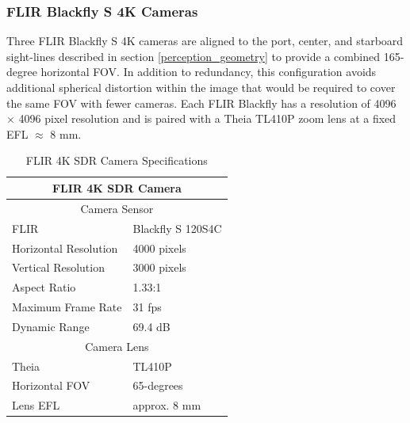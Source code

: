 \documentclass{erauthesis}
\begin{document}
\subsubsection{FLIR Blackfly S 4K Cameras} \label{sensors_FLIR}

Three FLIR Blackfly S 4K cameras are aligned to the port, center, and starboard sight-lines described in section \ref{perception_geometry} to provide a combined 165-degree horizontal \ac{FOV}.
In addition to redundancy, this configuration avoids additional spherical distortion within the image that would be required to cover the same \ac{FOV} with fewer cameras.
Each FLIR Blackfly has a resolution of 4096 $\times$ 4096 pixel resolution and is paired with a Theia TL410P zoom lens at a fixed \ac{EFL} $\approx$ 8 mm.


\begin{table}[htbp]
\centering
\caption{FLIR 4K SDR Camera Specifications}
\begin{tabular}{ll}
\hline
\multicolumn{2}{c}{FLIR 4K SDR Camera}\\
\hline
\hline
\multicolumn{2}{c}{Camera Sensor}\\
\hline
FLIR & Blackfly S 120S4C \\
Horizontal Resolution & 4000 pixels \\
Vertical Resolution & 3000 pixels \\
Aspect Ratio & 1.33:1 \\
Maximum Frame Rate & 31 fps \\
Dynamic Range & 69.4 dB \\
\multicolumn{2}{c}{Camera Lens}\\
\hline
Theia & TL410P\\
Horizontal \Ac{FOV} & 65-degrees\\
Lens \Ac{EFL} & approx. 8 mm\\
\hline
\end{tabular}
\label{table:SDR_camera_specs}
\end{table}
\end{document}
